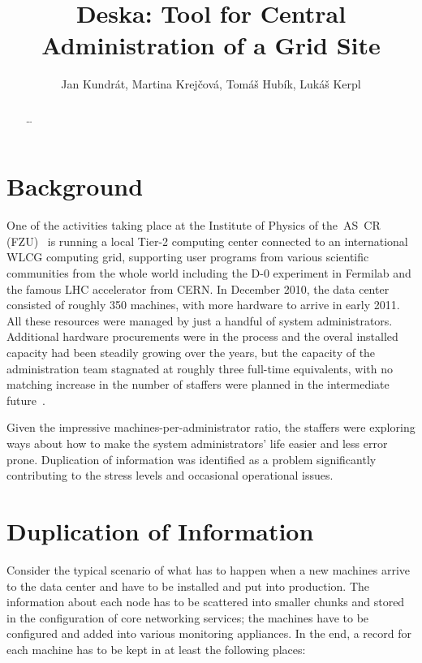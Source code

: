 \documentclass[a4paper]{jpconf}
\begin{document}
\title{Deska: Tool for Central Administration of a Grid Site}
\author{Jan Kundrát, Martina Krejčová, Tomáš Hubík, Lukáš Kerpl}
\address{Institute of Physics, AS CR, Na Slovance 22, 182 21, Prague, Czech
Republic}

\begin{abstract}
    \ldots
\end{abstract}

\section{Background}

One of the activities taking place at the Institute of Physics of the~AS~CR (FZU)~\cite{fzu} is running a local Tier-2 computing center
connected to an international WLCG computing grid, supporting user programs from various scientific communities from the whole world
including the D-0 experiment in Fermilab and the famous LHC accelerator from CERN.  In December 2010, the data center consisted of
roughly 350 machines, with more hardware to arrive in early 2011.  All these resources were managed by just a handful of system
administrators.  Additional hardware procurements were in the process and the overal installed capacity had been steadily growing over
the years, but the capacity of the administration team stagnated at roughly three full-time equivalents, with no matching increase in
the number of staffers were planned in the intermediate future~\cite{dubna-kundrat}.

Given the impressive machines-per-administrator ratio, the staffers were exploring ways about how to make the system administrators'
life easier and less error prone.  Duplication of information was identified as a problem significantly contributing to the stress
levels and occasional operational issues.

\section{Duplication of Information}

Consider the typical scenario of what has to happen when a new machines arrive to the data center and have to be installed and put into
production.  The information about each node has to be scattered into smaller chunks and stored in the configuration of core networking
services; the machines have to be configured and added into various monitoring appliances.  In the end, a record for each machine has
to be kept in at least the following places:
\end{document}
